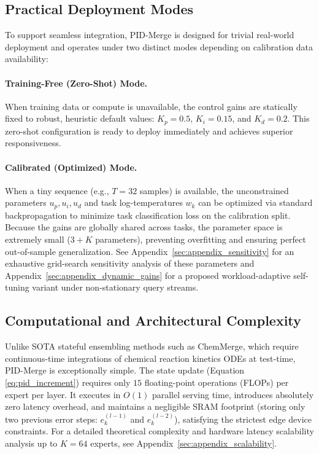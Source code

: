 \subsection{Practical Deployment Modes}
To support seamless integration, PID-Merge is designed for trivial real-world deployment and operates under two distinct modes depending on calibration data availability:

\paragraph{Training-Free (Zero-Shot) Mode.} When training data or compute is unavailable, the control gains are statically fixed to robust, heuristic default values: $K_p = 0.5$, $K_i = 0.15$, and $K_d = 0.2$. This zero-shot configuration is ready to deploy immediately and achieves superior responsiveness.

\paragraph{Calibrated (Optimized) Mode.} When a tiny sequence (e.g., $T = 32$ samples) is available, the unconstrained parameters $u_p, u_i, u_d$ and task log-temperatures $w_k$ can be optimized via standard backpropagation to minimize task classification loss on the calibration split. Because the gains are globally shared across tasks, the parameter space is extremely small ($3 + K$ parameters), preventing overfitting and ensuring perfect out-of-sample generalization. See Appendix~\ref{sec:appendix_sensitivity} for an exhaustive grid-search sensitivity analysis of these parameters and Appendix~\ref{sec:appendix_dynamic_gains} for a proposed workload-adaptive self-tuning variant under non-stationary query streams.

\subsection{Computational and Architectural Complexity}
Unlike SOTA stateful ensembling methods such as ChemMerge, which require continuous-time integrations of chemical reaction kinetics ODEs at test-time, PID-Merge is exceptionally simple. The state update (Equation \ref{eq:pid_increment}) requires only $15$ floating-point operations (FLOPs) per expert per layer. It executes in $O(1)$ parallel serving time, introduces absolutely zero latency overhead, and maintains a negligible SRAM footprint (storing only two previous error steps: $e_k^{(l-1)}$ and $e_k^{(l-2)}$), satisfying the strictest edge device constraints. For a detailed theoretical complexity and hardware latency scalability analysis up to $K=64$ experts, see Appendix~\ref{sec:appendix_scalability}.

